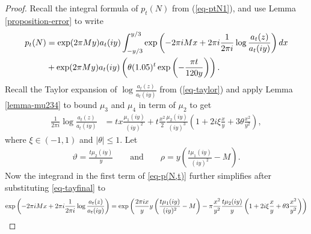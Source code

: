 \documentclass[11pt]{amsart}
\theoremstyle{plain}
\numberwithin{equation}{section}
\begin{document}
	\begin{proof}
		Recall the integral formula of $p_t(N)$ from (\ref{eq-ptN1}),
		and use Lemma \ref{proposition-error} to write
		\begin{align}\label{eq-p(N,t)}
			p_t(N)&=\exp(2\pi My)a_{t}(iy)\int_{-y/3}^{y/3}\exp\left(-2\pi i Mx+2\pi i\frac{1}{2\pi i}\log\frac{a_{t}(z)}{a_{t}(iy)}\right)dx\\
			\notag
			&+\exp(2\pi My)a_{t}(iy)\left(\theta(1.05)^{t}\exp\left(-\frac{\pi t}{120y}\right)\right).
		\end{align}
		Recall the Taylor expansion of $\log \frac{a_t(z)}{a_t(iy)}$ from (\ref{eq-taylor}) and apply Lemma \ref{lemma-mu234} to bound $\mu_3$ and $\mu_4$ in term of $\mu_2$ to get  
		\begin{align}\label{eq-tayfinal}
			\frac{1}{2\pi i}\log \frac{a_{t}(z)}{a_{t}(iy)}&=tx\frac{\mu_{1}(iy)}{(iy)^{2}}+t\frac{x^{2}}{2}\frac{\mu_{2}(iy)}{(iy)^{3}}\left(1+2i\xi\frac{x}{y}+3\theta\frac{x^{2}}{y^{2}}\right),   
		\end{align}
		where $\xi \in(-1,1)$ and $|\theta|\le 1.$
		\newline
		Let
		\begin{align}\label{eq-alphaerr}
			\vartheta=\frac{t\mu_{2}(iy)}{y} \qquad\text{and} \qquad\rho=y\left(\frac{t\mu_{1}(iy)}{(iy)^{2}}-M\right). 
		\end{align}
		Now the integrand in the first term of \eqref{eq-p(N,t)} further simplifies after substituting \eqref{eq-tayfinal} to
		\begin{align}\label{eq-exppart}
			\notag
			\exp\left(-2\pi i Mx+2\pi i\frac{1}{2\pi i}\log\frac{a_{t}(z)}{a_{t}(iy)}\right)&=\exp\left(\frac{2\pi ix}{y}y\left(\frac{t\mu_1(iy)}{(iy)^{2}}-M\right)-\pi \frac{x^{2}}{y^{2}}\frac{t\mu_{2}(iy)}{y}\left(1+2i\xi \frac{x}{y}+\theta 3\frac{x^{2}}{y^{2}}\right)\right)\\

\end{align}
\end{proof}
\end{document}
